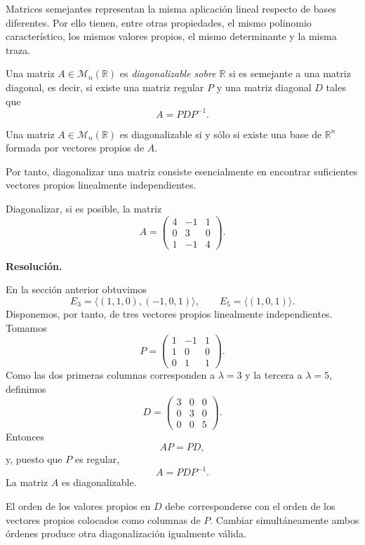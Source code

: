 Matrices semejantes representan la misma aplicación lineal respecto de bases diferentes. Por ello tienen, entre otras propiedades, el mismo polinomio característico, los mismos valores propios, el mismo determinante y la misma traza.

\begin{definition}
Una matriz $A\in\mathcal M_n(\mathbb{R})$ es \emph{diagonalizable sobre $\mathbb{R}$} si es semejante a una matriz diagonal, es decir, si existe una matriz regular $P$ y una matriz diagonal $D$ tales que
\[
A=PDP^{-1}.
\]
\end{definition}

\begin{theorem}
Una matriz $A\in\mathcal M_n(\mathbb{R})$ es diagonalizable si y sólo si existe una base de $\mathbb{R}^n$ formada por vectores propios de $A$.
\end{theorem}

Por tanto, diagonalizar una matriz consiste esencialmente en encontrar suficientes vectores propios linealmente independientes.

\begin{solvedexercise}
Diagonalizar, si es posible, la matriz
\[
A=\begin{pmatrix}
4&-1&1\\
0&3&0\\
1&-1&4
\end{pmatrix}.
\]

\textbf{Resolución.}\par\smallskip
En la sección anterior obtuvimos
\[
E_3=\langle(1,1,0),(-1,0,1)\rangle,
\qquad
E_5=\langle(1,0,1)\rangle.
\]
Disponemos, por tanto, de tres vectores propios linealmente independientes. Tomamos
\[
P=\begin{pmatrix}
1&-1&1\\
1&0&0\\
0&1&1
\end{pmatrix}.
\]
Como las dos primeras columnas corresponden a $\lambda=3$ y la tercera a $\lambda=5$, definimos
\[
D=\begin{pmatrix}
3&0&0\\
0&3&0\\
0&0&5
\end{pmatrix}.
\]
Entonces
\[
AP=PD,
\]
y, puesto que $P$ es regular,
\[
\boxed{A=PDP^{-1}.}
\]
La matriz $A$ es diagonalizable.
\end{solvedexercise}

El orden de los valores propios en $D$ debe corresponderse con el orden de los vectores propios colocados como columnas de $P$. Cambiar simultáneamente ambos órdenes produce otra diagonalización igualmente válida.

